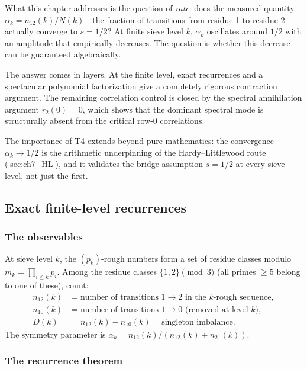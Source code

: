 \documentclass[12pt,a4paper]{article}
\begin{document}
What this chapter addresses is the question of \emph{rate}: does the
measured quantity $\alpha_k = n_{12}(k) / N(k)$---the fraction of
transitions from residue 1 to residue 2---actually converge to
$s = 1/2$? At finite sieve level $k$, $\alpha_k$ oscillates around
$1/2$ with an amplitude that empirically decreases. The question is
whether this decrease can be guaranteed algebraically.

The answer comes in layers. At the finite level, exact recurrences
and a spectacular polynomial factorization give a completely
rigorous contraction argument. The remaining correlation control is closed by the
spectral annihilation argument $r_2(0) = 0$, which
shows that the dominant spectral mode is structurally absent from
the critical row-$0$ correlations.

The importance of T4 extends beyond pure mathematics: the
convergence $\alpha_k \to 1/2$ is the arithmetic underpinning of
the Hardy--Littlewood route (\cref{sec:ch7_HL}), and it validates
the bridge assumption $s = 1/2$ at every sieve level, not just the
first.

\subsection{Exact finite-level recurrences}
\label{sec:ch7_recurrence}

\subsubsection{The observables}

At sieve level $k$, the $(p_k)$-rough numbers form a set of
residue classes modulo $m_k = \prod_{i \leq k} p_i$. Among the
residue classes $\{1, 2\} \pmod{3}$ (all primes $\geq 5$ belong
to one of these), count:
\begin{align}
  n_{12}(k) &= \text{number of transitions } 1 \to 2 \text{ in the } k\text{-rough sequence}, \\
  n_{10}(k) &= \text{number of transitions } 1 \to 0 \text{ (removed at level } k\text{)}, \\
  D(k)      &= n_{12}(k) - n_{10}(k) = \text{singleton imbalance}.
\end{align}
The symmetry parameter is $\alpha_k = n_{12}(k) / (n_{12}(k) + n_{21}(k))$.

\subsubsection{The recurrence theorem}
\end{document}
